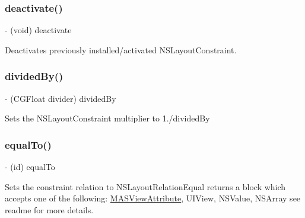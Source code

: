 \subsubsection{\texorpdfstring{deactivate()}{deactivate()}}
{\footnotesize\ttfamily -\/ (void) deactivate \begin{DoxyParamCaption}{ }\end{DoxyParamCaption}}

Deactivates previously installed/activated N\+S\+Layout\+Constraint. \mbox{\label{interface_m_a_s_constraint_ad70cd0330c4f81e55f3eb7d54c941612}} 
\subsubsection{\texorpdfstring{divided\+By()}{dividedBy()}}
{\footnotesize\ttfamily -\/ (C\+G\+Float divider) divided\+By \begin{DoxyParamCaption}{ }\end{DoxyParamCaption}}

Sets the N\+S\+Layout\+Constraint multiplier to 1./divided\+By \mbox{\label{interface_m_a_s_constraint_a116e3369c6e54160d3de01c3fef68897}} 
\subsubsection{\texorpdfstring{equal\+To()}{equalTo()}}
{\footnotesize\ttfamily -\/ (id) equal\+To \begin{DoxyParamCaption}{ }\end{DoxyParamCaption}}

Sets the constraint relation to N\+S\+Layout\+Relation\+Equal returns a block which accepts one of the following\+: \mbox{\hyperlink{interface_m_a_s_view_attribute}{M\+A\+S\+View\+Attribute}}, U\+I\+View, N\+S\+Value, N\+S\+Array see readme for more details. \mbox{\label{interface_m_a_s_constraint_a06df7a7cb2a7c3e32197800487d8d927}} 
